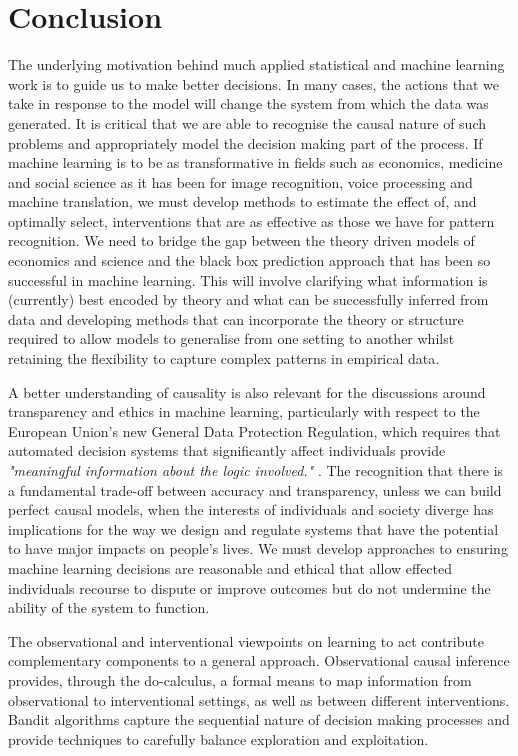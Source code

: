 \documentclass[11pt,a4paper,twoside]{report}
\theoremstyle{plain}
\theoremstyle{definition}
\begin{document}
\chapter{Conclusion}

The underlying motivation behind much applied statistical and machine learning work is to guide us to make better decisions. In many cases, the actions that we take in response to the model will change the system from which the data was generated. It is critical that we are able to recognise the causal nature of such problems and appropriately model the decision making part of the process. If machine learning is to be as transformative in fields such as economics, medicine and social science as it has been for image recognition, voice processing and machine translation, we must develop methods to estimate the effect of, and optimally select, interventions that are as effective as those we have for pattern recognition. We need to bridge the gap between the theory driven models of economics and science and the black box prediction approach that has been so successful in machine learning. This will involve clarifying what information is (currently) best encoded by theory and what can be successfully inferred from data and developing methods that can incorporate the theory or structure required to allow models to generalise from one setting to another whilst retaining the flexibility to capture complex patterns in empirical data. 

A better understanding of causality is also relevant for the discussions around transparency and ethics in machine learning, particularly with respect to the European Union's new General Data Protection Regulation, which requires that automated decision systems that significantly affect individuals provide \textit{"meaningful information about the logic involved."} \cite{Goodman2016}. The recognition that there is a fundamental trade-off between accuracy and transparency, unless we can build perfect causal models, when the interests of individuals and society diverge has implications for the way we design and regulate systems that have the potential to have major impacts on people's lives. We must develop approaches to ensuring machine learning decisions are reasonable and ethical that allow effected individuals recourse to dispute or improve outcomes but do not undermine the ability of the system to function. 

The observational and interventional viewpoints on learning to act contribute complementary components to a general approach. Observational causal inference provides, through the do-calculus, a formal means to map information from observational to interventional settings, as well as between different interventions. Bandit algorithms capture the sequential nature of decision making processes and provide techniques to carefully balance exploration and exploitation. 
\end{document}
